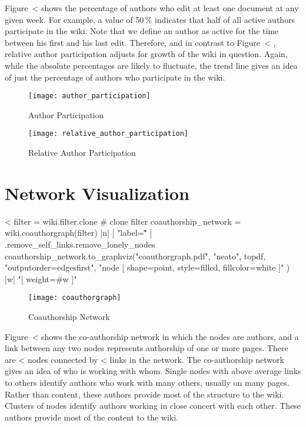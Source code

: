 \documentclass{scrartcl}
\begin{document}
Figure~<%
shows the percentage of authors who edit at least one document at any given week. For example, a value of 50\,\% indicates that half of all active authors participate in the wiki. Note that we define an author as active for the time between his first and his last edit. Therefore, and in contrast to Figure~<%
, relative author participation adjusts for growth of the wiki in question. Again, while the absolute percentages are likely to fluctuate, the trend line gives an idea of just the percentage of authors who participate in the wiki.

\begin{figure}[htbp]
  \texttt{[image: author\_participation]}
  \caption{Author Participation}
  \label{fig:author_participation}
  \vfill

  \texttt{[image: relative\_author\_participation]}
  \caption{Relative Author Participation}
  \label{fig:relative_author_participation}
\end{figure}


\section{Network Visualization} %
\label{sec:network_visualization}

<%
filter = wiki.filter.clone # clone filter
coauthorship_network = wiki.coauthorgraph(filter) { |n| [ "label=\"\"" ] }.remove_self_links.remove_lonely_nodes
coauthorship_network.to_graphviz("coauthorgraph.pdf", "neato", topdf, "outputorder=edgesfirst", "node [ shape=point, style=filled, fillcolor=white ]" ) { |w|  "[ weight=#{w} ]" }
\begin{figure}[htbp]
	\centering
	\texttt{[image: coauthorgraph]}
	\caption{Coauthorship Network}
	\label{fig:coauthorship_network}
\end{figure}

Figure~<%
shows the co-authorship network in which the nodes are authors, and a link between any two nodes represents authorship of one or more pages. There are <%
nodes connected by <%
links in the network. The co-authorship network gives an idea of who is working with whom. Single nodes with above average links to others identify authors who work with many others, usually on many pages. Rather than content, these authors provide most of the structure to the wiki. Clusters of nodes identify authors working in close concert with each other. These authors provide most of the content to the wiki.
\end{document}
